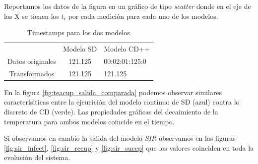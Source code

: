 Reportamos los datos de la figura en un gráfico de tipo \textit{scatter} donde en el eje de las X se tienen los $t_i$ por cada medición para cada uno de los modelos.

\begin{table}[H]
    \centering
    \label{tab:times}
    \begin{tabular}{c | c  l}
        & Modelo SD & Modelo CD++ \\
       Datos originales & 121.125 & 00:02:01:125:0 \\ 
        Transformados & 121.125 & 121.125
    \end{tabular}
    \caption{Timestamps para los dos modelos} 
\end{table}


En la figura \ref{fig:teacup_salida_comparada} podemos observar similares caracterísiticas entre la ejeucición del modelo contínuo de SD (azul) contra lo discreto de CD (verde). Las propiedades gráficas del decaimiento de la temperatura para ambos modelos coincide en el tiempo.


\begin{figure}[H]
    \centering     %
\end{figure}

Si observamos en cambio la salida del modelo \textit{SIR} observamos en las figuras \ref{fig:sir_infect}, \ref{fig:sir_recup} y \ref{fig:sir_sucep} que los valores coinciden en toda la evolución del sistema.

